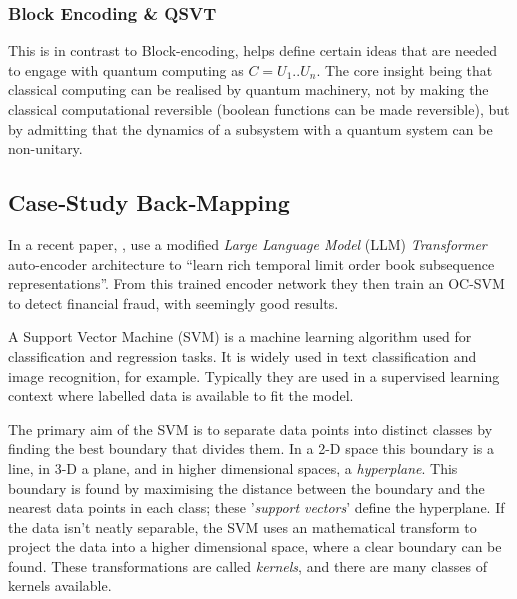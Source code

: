 




\subsubsection{Block Encoding \& QSVT}

This is in contrast to Block-encoding, 
helps define certain ideas that are needed to engage with quantum computing as $C = U_1 .. U_n$. 
The core insight being that classical computing can be realised by quantum machinery, 
not by making the classical computational reversible (boolean functions can be made reversible\cite{Bennett:1989}),
but by admitting that the dynamics of a subsystem with a quantum system can be non-unitary.

\subsection{Case‑Study Back‑Mapping}

In a recent paper, , \citeauthor{Poutre:2024} \cite{Poutre:2024} use a modified 
\emph{Large Language Model} (LLM) \emph{Transformer} auto-encoder architecture to 
\enquote{learn rich temporal limit order book subsequence representations}.  
From this trained encoder network they then train an OC-SVM to detect financial fraud, with seemingly good results.

A Support Vector Machine (SVM) is a machine learning algorithm used for classification and regression tasks.  
It is widely used in text classification and image recognition, for example.
Typically they are used in a supervised learning context where labelled data is available to fit the model.

The primary aim of the SVM is to separate data points into distinct classes by finding the best boundary that divides them.
In a 2-D space this boundary is a line, in 3-D a plane, and in higher dimensional spaces, a \emph{hyperplane}.
This boundary is found by maximising the distance between the boundary and the nearest data points in each class;
these '\emph{support vectors}' define the hyperplane. 
If the data isn't neatly separable, 
the SVM uses an mathematical transform to project the data into a higher dimensional space, 
where a clear boundary can be found.
These transformations are called \emph{kernels}, and there are many classes of kernels available.

